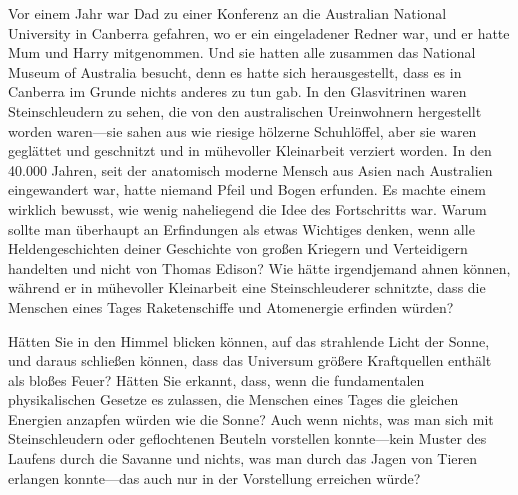 Vor einem Jahr war Dad zu einer Konferenz an die Australian National University in Canberra gefahren, wo er ein eingeladener Redner war, und er hatte Mum und Harry mitgenommen. Und sie hatten alle zusammen das National Museum of Australia besucht, denn es hatte sich herausgestellt, dass es in Canberra im Grunde nichts anderes zu tun gab. In den Glasvitrinen waren Steinschleudern zu sehen, die von den australischen Ureinwohnern hergestellt worden waren—sie sahen aus wie riesige hölzerne Schuhlöffel, aber sie waren geglättet und geschnitzt und in mühevoller Kleinarbeit verziert worden. In den 40.000 Jahren, seit der anatomisch moderne Mensch aus Asien nach Australien eingewandert war, hatte niemand Pfeil und Bogen erfunden. Es machte einem wirklich bewusst, wie wenig naheliegend die Idee des Fortschritts war. Warum sollte man überhaupt an Erfindungen als etwas Wichtiges denken, wenn alle Heldengeschichten deiner Geschichte von großen Kriegern und Verteidigern handelten und nicht von Thomas Edison? Wie hätte irgendjemand ahnen können, während er in mühevoller Kleinarbeit eine Steinschleuderer schnitzte, dass die Menschen eines Tages Raketenschiffe und Atomenergie erfinden würden?

Hätten Sie in den Himmel blicken können, auf das strahlende Licht der Sonne, und daraus schließen können, dass das Universum größere Kraftquellen enthält als bloßes Feuer? Hätten Sie erkannt, dass, wenn die fundamentalen physikalischen Gesetze es zulassen, die Menschen eines Tages die gleichen Energien anzapfen würden wie die Sonne? Auch wenn nichts, was man sich mit Steinschleudern oder geflochtenen Beuteln vorstellen konnte—kein Muster des Laufens durch die Savanne und nichts, was man durch das Jagen von Tieren erlangen konnte—das auch nur in der Vorstellung erreichen würde?

